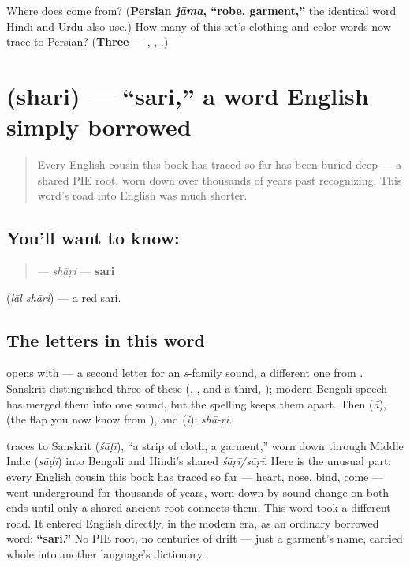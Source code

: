 \begin{tcolorbox}[breakable,colback=teal!4,colframe=teal!35!black,title={Before you move on}]
Where does  come from? (\textbf{Persian \emph{jāma}, \textquotedblleft{}robe, garment,\textquotedblright{}} the identical word Hindi and Urdu also use.) How many of this set's clothing and color words now trace to Persian? (\textbf{Three} — , , .)
\end{tcolorbox}
\section[shari]{ (shari) — \textquotedblleft{}sari,\textquotedblright{} a word English simply borrowed}

\label{lesson:BN-C15-shari}



\begin{quote}
Every English cousin this book has traced so far has been buried deep — a shared PIE root, worn down over thousands of years past recognizing. This word's road into English was much shorter.
\end{quote}

\subsection*{You'll want to know: }
\begin{quote}
\textbf{} — \emph{shāṛi} — \textbf{sari}
\end{quote}

  (\emph{lāl shāṛi}) — a red sari.

\subsection*{The letters in this word}
\textbf{} opens with \textbf{} — a second letter for an \emph{s}-family sound, a different one from . Sanskrit distinguished three of these (\textbf{}, \textbf{}, and a third, \textbf{}); modern Bengali speech has merged them into one sound, but the spelling keeps them apart. Then \textbf{} (\emph{ā}), \textbf{} (the flap you now know from ), and \textbf{} (\emph{i}): \emph{shā-ṛi}.

\begin{cousinweb}
\textbf{} traces to Sanskrit \textbf{} (\emph{śāṭī}), \textquotedblleft{}a strip of cloth, a garment,\textquotedblright{} worn down through Middle Indic \textbf{} (\emph{sāḍī}) into Bengali and Hindi's shared \emph{śāṛī/sāṛī}. Here is the unusual part: every English cousin this book has traced so far — heart, nose, bind, come — went underground for thousands of years, worn down by sound change on both ends until only a shared ancient root connects them. This word took a different road. It entered English directly, in the modern era, as an ordinary borrowed word: \textbf{\textquotedblleft{}sari.\textquotedblright{}} No PIE root, no centuries of drift — just a garment's name, carried whole into another language's dictionary.
\end{cousinweb}

